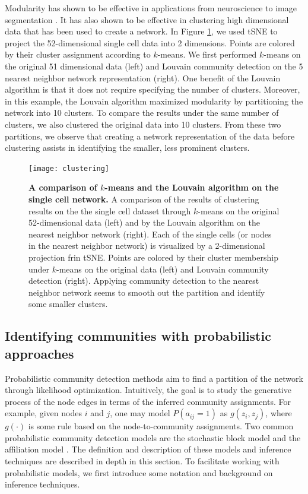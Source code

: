 \indent Modularity has shown to be effective in applications from neuroscience \cite{hierarchicalmod} to image segmentation \cite{browet}. It has also shown to be effective in clustering high dimensional data that has been used to create a network. In Figure \ref{fig:clustering}, we used tSNE \cite{TwoD} to project the 52-dimensional single cell data into 2 dimensions. Points are colored by their cluster assignment according to $k$-means. We first performed $k$-means on the original 51 dimensional data (left) and Louvain community detection on the 5 nearest neighbor network representation (right). One benefit of the Louvain algorithm is that it does not require specifying the number of clusters. Moreover, in this example, the Louvain algorithm maximized modularity by partitioning the network into 10 clusters. To compare the results under the same number of clusters, we also clustered the original data into 10 clusters. From these two partitions, we observe that creating a network representation of the data before clustering assists in identifying the smaller, less prominent clusters.


 \begin{figure}
\begin{center}
\texttt{[image: clustering]}
\caption{{\bf A comparison of $k$-means and the Louvain algorithm on the single cell network.} A comparison of the results of clustering results on the the single cell dataset through $k$-means on the original 52-dimensional data (left) and by the Louvain algorithm on the nearest neighbor network (right). Each of the single cells (or nodes in the nearest neighbor network) is visualized by a 2-dimensional projection frin tSNE. Points are colored by their cluster membership under $k$-means on the original data (left) and Louvain community detection (right). Applying community detection to the nearest neighbor network seems to smooth out the partition and identify some smaller clusters. }
\label{fig:clustering}
\end{center}
\end{figure}

\subsection{Identifying communities with probabilistic approaches}

\indent Probabilistic community detection methods aim to find a partition of the network through likelihood optimization. Intuitively, the goal is to study the generative process of the node edges in terms of the inferred community assignments. For example, given nodes $i$ and $j$, one may model $P(a_{ij}=1)$ as $g(z_{i},z_{j})$, where $g(\cdot)$ is some rule based on the node-to-community assignments. Two common probabilistic community detection models are the stochastic block model \cite{originalSBM} and the affiliation model \cite{affil}. The definition and description of these models and inference techniques are described in depth in this section. To facilitate working with probabilistic models, we first introduce some notation and background on inference techniques. 

